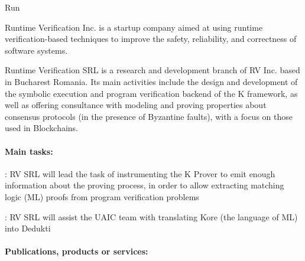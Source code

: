 \begin{sitedescription}{Run}



Runtime Verification Inc. is a startup company aimed at using runtime verification-based
techniques to improve the safety, reliability, and correctness of software systems.

Runtime Verification SRL is a research and development branch of RV Inc. based
in Bucharest Romania.  Its main activities include the design and development of
the symbolic execution and program verification backend of the K framework,
as well as offering consultance with modeling and proving properties about
consensus protocols (in the presence of Byzantine faults),
with a focus on those used in Blockchains.

\paragraph*{Main tasks:}



\begin{compactitem}
\item {}: RV SRL will lead the task of
  instrumenting the K Prover to emit enough information about the
  proving process, in order to allow extracting matching logic (ML)
  proofs from program verification problems
\item {}: RV SRL will assist the UAIC team
  with translating Kore (the language of ML) into Dedukti
\end{compactitem}

\paragraph*{Publications, products or services:}



\end{sitedescription}

